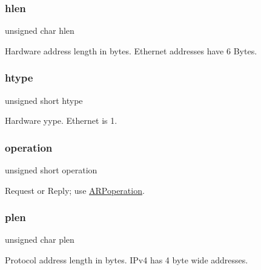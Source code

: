 \subsubsection{\texorpdfstring{hlen}{hlen}}
{\footnotesize\ttfamily unsigned char hlen}



Hardware address length in bytes. Ethernet addresses have 6 Bytes. 

\mbox{\label{struct_a_r_pmessage___a46715ba000c9a625f4b6310f1f09afc7}} 
\subsubsection{\texorpdfstring{htype}{htype}}
{\footnotesize\ttfamily unsigned short htype}



Hardware yype. Ethernet is 1. 

\mbox{\label{struct_a_r_pmessage___a9d6488f4b1701ea19f48f8c589c525cc}} 
\subsubsection{\texorpdfstring{operation}{operation}}
{\footnotesize\ttfamily unsigned short operation}



Request or Reply; use \mbox{\hyperlink{group__arp_ga051b3dc0fecaa617590192d2fb74688a}{A\+R\+Poperation}}. 

\mbox{\label{struct_a_r_pmessage___a3bdad4fbaa0d1a8b657090905c7b58ed}} 
\subsubsection{\texorpdfstring{plen}{plen}}
{\footnotesize\ttfamily unsigned char plen}



Protocol address length in bytes. I\+Pv4 has 4 byte wide addresses. 

\mbox{\label{struct_a_r_pmessage___a141d5699e3106d94bee5842b6b0d3e14}} 
